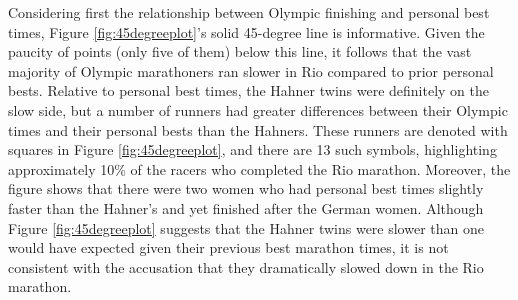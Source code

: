 \documentclass[12pt,titlepage]{article}
\begin{document}
Considering first the relationship between Olympic finishing and
personal best times, Figure \ref{fig:45degreeplot}'s solid 45-degree
line is informative.  Given the paucity of points (only five of them)
below this line, it follows that the vast majority of Olympic
marathoners ran slower in Rio compared to prior personal bests.
Relative to personal best times, the Hahner twins were definitely on
the slow side, but a number of runners had greater differences between
their Olympic times and their personal bests than the Hahners.  These
runners are denoted with squares in Figure \ref{fig:45degreeplot}, and
there are 13 such symbols, highlighting approximately 10\% of the
racers who completed the Rio marathon.  Moreover, the figure shows
that there were two women who had personal best times slightly faster
than the Hahner's and yet finished after the German women.  Although
Figure \ref{fig:45degreeplot} suggests that the Hahner twins were
slower than one would have expected given their previous best marathon
times, it is not consistent with the accusation that they dramatically
slowed down in the Rio marathon.

\end{document}
